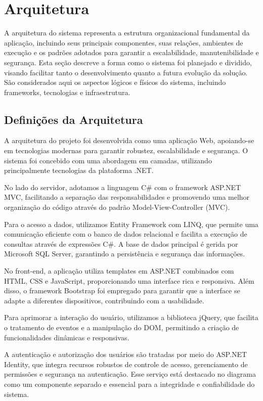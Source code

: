 \documentclass[
	12pt,				%
	openright,			%
	twoside,			%
	a4paper,			%
	english,			%
	french,				%
	spanish,			%
	brazil				%
	]{abntex2}
\begin{document}
\section{Arquitetura}

A arquitetura do sistema representa a estrutura organizacional fundamental da aplicação, incluindo seus principais componentes, suas relações, ambientes de execução e os padrões adotados para garantir a escalabilidade, manutenibilidade e segurança. Esta seção descreve a forma como o sistema foi planejado e dividido, visando facilitar tanto o desenvolvimento quanto a futura evolução da solução. São considerados aqui os aspectos lógicos e físicos do sistema, incluindo frameworks, tecnologias e infraestrutura.


\subsection{Definições da Arquitetura}

A arquitetura do projeto foi desenvolvida como uma aplicação Web, apoiando-se em tecnologias modernas para garantir robustez, escalabilidade e segurança. O sistema foi concebido com uma abordagem em camadas, utilizando principalmente tecnologias da plataforma .NET.

No lado do servidor, adotamos a linguagem C\# com o framework ASP.NET MVC, facilitando a separação das responsabilidades e promovendo uma melhor organização do código através do padrão Model-View-Controller (MVC).

Para o acesso a dados, utilizamos Entity Framework com LINQ, que permite uma comunicação eficiente com o banco de dados relacional e facilita a execução de consultas através de expressões C\#. A base de dados principal é gerida por Microsoft SQL Server, garantindo a persistência e segurança das informações.

No front-end, a aplicação utiliza templates em ASP.NET combinados com HTML, CSS e JavaScript, proporcionando uma interface rica e responsiva. Além disso, o framework Bootstrap foi empregado para garantir que a interface se adapte a diferentes dispositivos, contribuindo com a usabilidade.

Para aprimorar a interação do usuário, utilizamos a biblioteca jQuery, que facilita o tratamento de eventos e a manipulação do DOM, permitindo a criação de funcionalidades dinâmicas e responsivas.

A autenticação e autorização dos usuários são tratadas por meio do ASP.NET Identity, que integra recursos robustos de controle de acesso, gerenciamento de permissões e segurança na autenticação. Esse serviço está destacado no diagrama como um componente separado e essencial para a integridade e confiabilidade do sistema.
\end{document}
